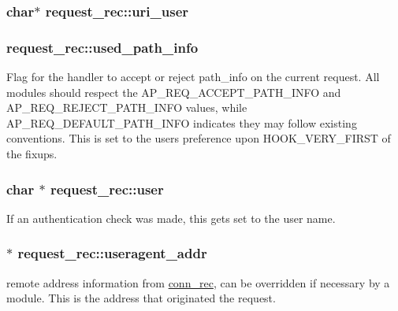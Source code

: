 \subsubsection[{\texorpdfstring{uri\+\_\+user}{uri_user}}]{\setlength{\rightskip}{0pt plus 5cm}char$\ast$ request\+\_\+rec\+::uri\+\_\+user}\hypertarget{structrequest__rec_abaf14e944dd88ed29640c434d5e5deba}{}\label{structrequest__rec_abaf14e944dd88ed29640c434d5e5deba}
\subsubsection[{\texorpdfstring{used\+\_\+path\+\_\+info}{used_path_info}}]{ request\+\_\+rec\+::used\+\_\+path\+\_\+info}\hypertarget{structrequest__rec_a5b463549b4dc27af708d9c577d1fc4c0}{}\label{structrequest__rec_a5b463549b4dc27af708d9c577d1fc4c0}
Flag for the handler to accept or reject path\+\_\+info on the current request. All modules should respect the A\+P\+\_\+\+R\+E\+Q\+\_\+\+A\+C\+C\+E\+P\+T\+\_\+\+P\+A\+T\+H\+\_\+\+I\+N\+FO and A\+P\+\_\+\+R\+E\+Q\+\_\+\+R\+E\+J\+E\+C\+T\+\_\+\+P\+A\+T\+H\+\_\+\+I\+N\+FO values, while A\+P\+\_\+\+R\+E\+Q\+\_\+\+D\+E\+F\+A\+U\+L\+T\+\_\+\+P\+A\+T\+H\+\_\+\+I\+N\+FO indicates they may follow existing conventions. This is set to the user\textquotesingle{}s preference upon H\+O\+O\+K\+\_\+\+V\+E\+R\+Y\+\_\+\+F\+I\+R\+ST of the fixups. 
\subsubsection[{\texorpdfstring{user}{user}}]{\setlength{\rightskip}{0pt plus 5cm}char $\ast$ request\+\_\+rec\+::user}\hypertarget{structrequest__rec_a63f3abd83f53633f9d0069bc39aeb424}{}\label{structrequest__rec_a63f3abd83f53633f9d0069bc39aeb424}
If an authentication check was made, this gets set to the user name. 
\subsubsection[{\texorpdfstring{useragent\+\_\+addr}{useragent_addr}}]{$\ast$ request\+\_\+rec\+::useragent\+\_\+addr}\hypertarget{structrequest__rec_a6c9cc65ba522448f726f2bfa75363c10}{}\label{structrequest__rec_a6c9cc65ba522448f726f2bfa75363c10}
remote address information from \hyperlink{structconn__rec}{conn\+\_\+rec}, can be overridden if necessary by a module. This is the address that originated the request. 
